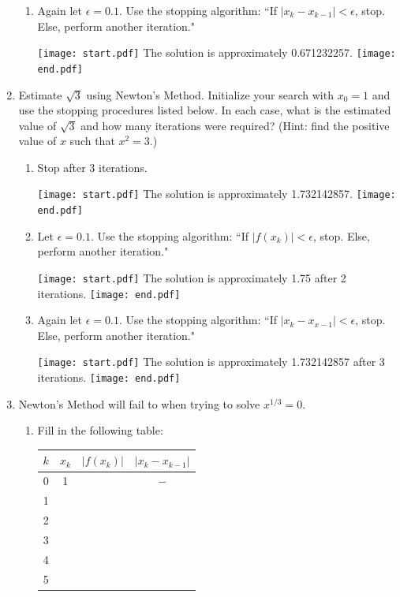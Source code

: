 \documentclass[12pt]{article}
\begin{document}
\begin{enumerate}
\begin{enumerate}
\item Again let $\epsilon=0.1$.  Use the stopping algorithm: ``If $|x_k-x_{k-1}|<\epsilon$, stop.  Else, perform another iteration."

\texttt{[image: start.pdf]}
{The solution is approximately 0.671232257.}
\texttt{[image: end.pdf]}


\end{enumerate}

\item Estimate $\sqrt{3}$ using Newton's Method.  Initialize your search with $x_0=1$ and use the stopping procedures listed below.  In each case, what is the estimated value of $\sqrt{3}$ and how many iterations were required?  (Hint: find the positive value of $x$ such that $x^2=3$.)

\begin{enumerate}

\item Stop after 3 iterations.

\texttt{[image: start.pdf]}
{The solution is approximately 1.732142857.}
\texttt{[image: end.pdf]}


\item Let $\epsilon=0.1$.  Use the stopping algorithm: ``If $|f(x_k)|<\epsilon$, stop.  Else, perform another iteration."

\texttt{[image: start.pdf]}
{The solution is approximately 1.75 after 2 iterations.}
\texttt{[image: end.pdf]}


\item Again let $\epsilon=0.1$.  Use the stopping algorithm: ``If $|x_k-x_{x-1}|<\epsilon$, stop.  Else, perform another iteration."

\texttt{[image: start.pdf]}
{The solution is approximately 1.732142857 after 3 iterations.}
\texttt{[image: end.pdf]}


\end{enumerate}

\item Newton's Method will fail to when trying to solve $x^{1/3}=0$.  

\begin{enumerate}

\item Fill in the following table:
\begin{center}
\begin{tabular}{|c|c|c|c|}
\hline
$k$ & $x_k$ & $|f(x_k)|$ & $|x_k-x_{k-1}|$\\
\hline
0 & 1 & & $-$\\
\hline
1 &&&\\
\hline
2 &&&\\
\hline
3&&&\\
\hline
4 &&&\\
\hline
5 &&&\\
\hline
\end{tabular}
\end{center}


\end{enumerate}
\end{enumerate}
\end{document}
